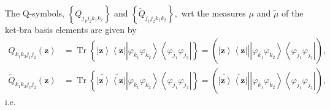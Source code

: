 \documentclass[aps,preprint]{revtex4}%
\begin{document}
The Q-symbols, $\left\{  Q_{j_{1}j_{2}k_{1}k_{2}}\right\}  $ and $\left\{
\tilde{Q}_{j_{1}j_{2}k_{1}k_{2}}\right\}  ,$ wrt the measures $\mu$ and
$\tilde{\mu}$ of the ket-bra basis elements are given by
\begin{align}
Q_{k_{1}k_{2}j_{1}j_{2}}\left(  \mathbf{z}\right)   &  =\operatorname*{Tr}%
\left\{  \left\vert \mathbf{z}\right\rangle \left\langle \mathbf{z}\right\vert
\left\vert \varphi_{k_{1}}\varphi_{k_{2}}\right\rangle \left\langle
\varphi_{j_{1}}\varphi_{j_{2}}\right\vert \right\}  =\left(  \left.
\overset{}{\left\vert \mathbf{z}\right\rangle \left\langle \mathbf{z}%
\right\vert }\right\vert \overset{}{\left\vert \varphi_{k_{1}}\varphi_{k_{2}%
}\right\rangle \left\langle \varphi_{j_{1}}\varphi_{j_{2}}\right\vert
}\right)  ,\nonumber\\
\tilde{Q}_{k_{1}k_{2}j_{1}j_{2}}\left(  \mathbf{z}\right)   &
=\operatorname*{Tr}\left\{  \widetilde{\left\vert \mathbf{z}\right\rangle
}\widetilde{\left\langle \mathbf{z}\right\vert }\left\vert \varphi_{k_{1}%
}\varphi_{k_{2}}\right\rangle \left\langle \varphi_{j_{1}}\varphi_{j_{2}%
}\right\vert \right\}  =\left(  \left.  \overset{}{\widetilde{\left\vert
\mathbf{z}\right\rangle }\widetilde{\left\langle \mathbf{z}\right\vert }%
}\right\vert \overset{}{\left\vert \varphi_{k_{1}}\varphi_{k_{2}}\right\rangle
\left\langle \varphi_{j_{1}}\varphi_{j_{2}}\right\vert }\right)  ,
\end{align}
i.e.
\end{document}
